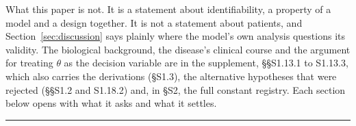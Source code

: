 What this paper is not. It is a statement about identifiability, a property of a model and
a design together. It is not a statement about patients, and Section~\ref{sec:discussion}
says plainly where the model's own analysis questions its validity. The biological
background, the disease's clinical course and the argument for treating $\theta$ as the
decision variable are in the supplement, \S\S S1.13.1 to S1.13.3, which also carries
the derivations
(\S S1.3), the alternative hypotheses that were rejected (\S\S S1.2 and S1.18.2) and,
in \S S2, the full constant registry. Each section
below opens with what it asks and what it settles.

\vspace{0.5em}
\hrule
\vspace{1em}

